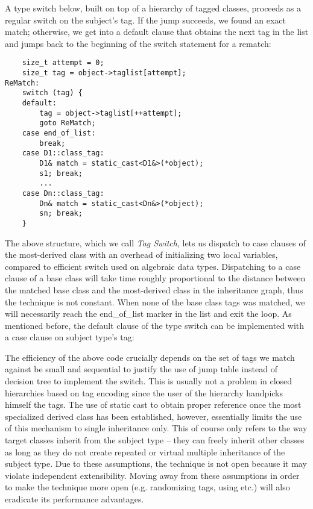 A type switch below, built on top of a hierarchy of tagged classes, proceeds as 
a regular switch on the subject's tag. If the jump succeeds, we found an exact 
match; otherwise, we get into a default clause that obtains the next tag in the
list and jumps back to the beginning of the switch statement for a rematch:

\begin{lstlisting}
    size_t attempt = 0; 
    size_t tag = object->taglist[attempt];
ReMatch:
    switch (tag) {
    default:
        tag = object->taglist[++attempt];
        goto ReMatch;
    case end_of_list: 
        break;
    case D1::class_tag: 
        D1& match = static_cast<D1&>(*object); 
        s1; break;
        ...
    case Dn::class_tag: 
        Dn& match = static_cast<Dn&>(*object); 
        sn; break;
    }
\end{lstlisting}

\noindent
The above structure, which we call \emph{Tag Switch}, lets us dispatch to 
case clauses of the most-derived class with an overhead of initializing two 
local variables, compared to efficient switch used on algebraic data types. 
Dispatching to a case clause of a base class will take time roughly proportional 
to the distance between the matched base class and the most-derived class in the 
inheritance graph, thus the technique is not constant. When none of the base 
class tags was matched, we will necessarily reach the end\_of\_list marker in 
the list and exit the loop. As mentioned before, the default 
clause of the type switch can be implemented with a case clause on subject 
type's tag: 

The efficiency of the above code crucially depends on the set of tags we match 
against be small and sequential to justify the use of jump table instead of 
decision tree to implement the switch. This is usually not a problem in closed 
hierarchies based on tag encoding since the user of the hierarchy handpicks 
himself the tags. The use of static cast to obtain proper reference once the most 
specialized derived class has been established, however, essentially limits the use of 
this mechanism to single inheritance only. This of course only refers to the way target 
classes inherit from the subject type -- they can freely inherit other classes 
as long as they do not create repeated or virtual multiple inheritance of the 
subject type. Due to these assumptions, the technique is not open because it may 
violate independent extensibility. Moving away from these assumptions in order 
to make the technique more open (e.g. randomizing tags, using 
 etc.) will also eradicate its performance advantages.